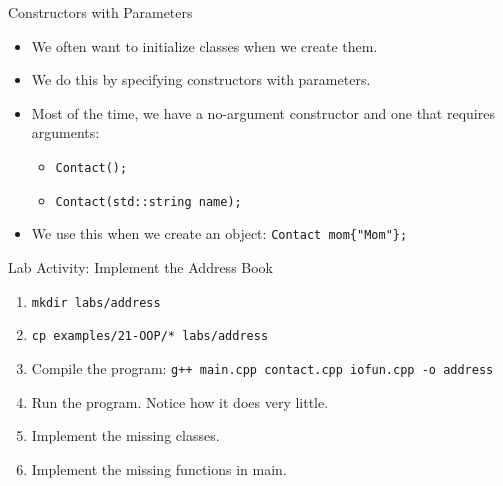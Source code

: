 \documentclass[]{beamer}
\begin{document}
\begin{frame}[fragile]{Constructors with Parameters}
    \begin{itemize}[<+(1)->]
        \item We often want to initialize classes when we create them.
        \item We do this by specifying constructors with parameters.
        \item Most of the time, we have a no-argument constructor and
            one that requires arguments:
            \begin{itemize}
                \item \verb!Contact();!
                \item \verb!Contact(std::string name);!
            \end{itemize}
        \item We use this when we create an object:
            \newline\verb!Contact mom{"Mom"};!
    \end{itemize}
\end{frame}

\begin{frame}[fragile]{Lab Activity: Implement the Address Book}
    \begin{enumerate}
        \item \verb!mkdir labs/address!
        \item \verb!cp examples/21-OOP/* labs/address!
        \item Compile the program: \verb!g++ main.cpp contact.cpp iofun.cpp -o address!
        \item Run the program. Notice how it does very little.
        \item Implement the missing classes.
        \item Implement the missing functions in main.
    \end{enumerate}
\end{frame}
\end{document}
